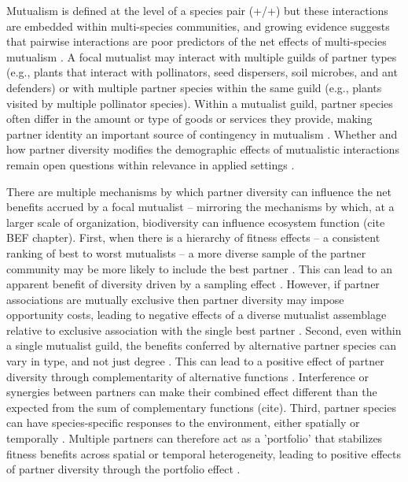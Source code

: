 \documentclass[11pt]{article}
\begin{document}
Mutualism is defined at the level of a species pair (+/+) but these interactions are embedded within multi-species communities, and growing evidence suggests that pairwise interactions are poor predictors of the net effects of multi-species mutualism \citep{Afkhami2014,Palmer2010}. 
A focal mutualist may interact with multiple guilds of partner types (e.g., plants that interact with pollinators, seed dispersers, soil microbes, and ant defenders) or with multiple partner species within the same guild (e.g., plants visited by multiple pollinator species). 
Within a mutualist guild, partner species often differ in the amount or type of goods or services they provide, making partner identity an important source of contingency in mutualism \citep{Stanton2003}. 
Whether and how partner diversity modifies the demographic effects of mutualistic interactions remain open questions within relevance in applied settings \citep{rogers2014bee}. 

There are multiple mechanisms by which partner diversity can influence the net benefits accrued by a focal mutualist -- mirroring the mechanisms by which, at a larger scale of organization, biodiversity can influence ecosystem function (cite BEF chapter). 
First, when there is a hierarchy of fitness effects -- a consistent ranking of best to worst mutualists -- a more diverse sample of the partner community may be more likely to include the best partner \cite{Frederickson2013}.
This can lead to an apparent benefit of diversity driven by a sampling effect \cite{Batstone2018}. 
However, if partner associations are mutually exclusive then partner diversity may impose opportunity costs, leading to negative effects of a diverse mutualist assemblage relative to exclusive association with the single best partner \citep{Miller2007}. 
Second, even within a single mutualist guild, the benefits conferred by alternative partner species can vary in type, and not just degree \cite{Stachowicz2005,Bronstein2006,Stanton2003}. 
This can lead to a positive effect of partner diversity through complementarity of alternative functions \cite{Batstone2018}. 
Interference or synergies between partners can make their combined effect different than the expected from the sum of complementary functions (cite). 
Third, partner species can have species-specific responses to the environment, either spatially \citep{Ollerton2006} or temporally \citep{Alarcon2008}. 
Multiple partners can therefore act as a 'portfolio' that stabilizes fitness benefits across spatial or temporal heterogeneity, leading to positive effects of partner diversity through the portfolio effect \cite{Batstone2018,Lazaro2022}. 
\end{document}
